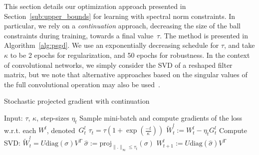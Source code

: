This section details our optimization approach presented in Section~\ref{sub:upper_bounds}
for learning with spectral norm constraints.
In particular, we rely on a \emph{continuation} approach, decreasing the size of the ball constraints
during training, towards a final value~$\tau$. The method is presented in Algorithm~\ref{alg:psgd}.
We use an exponentially decreasing schedule for $\tau$,
and take $\kappa$ to be 2 epochs for regularization, and 50 epochs for robustness.
In the context of convolutional networks, we simply consider the SVD of a reshaped filter matrix,
but we note that alternative approaches based on the singular values of the full convolutional operation
may also be used~\citep{sedghi2018singular}.


\begin{algorithm}[th]
	\caption{Stochastic projected gradient with continuation}
	\label{alg:psgd}
	\begin{algorithmic}
	\STATE Input: $\tau$, $\kappa$, step-sizes $\eta_t$
		\STATE Sample mini-batch and compute gradients of the loss w.r.t. each $W^l$, denoted~$G_t^l$
		\STATE $\tau_{t}=\tau (1 + \exp{\left(\frac{-t}{\kappa}\right)})$
		\STATE 	$\tilde W_t^l := W_t^l - \eta_t G_t^l$
		\STATE Compute SVD: $\tilde W_t^l = U \text{diag}(\sigma) V^T$
		\STATE  $ \widehat{\sigma} := \text{proj}_{\|.\|_{\infty} \leq \tau_t}\left(\sigma\right)$
		\STATE 	$ W_{t+1}^l := U\text{diag}(\widehat{\sigma})V^T$
		\ENDFOR
		\ENDFOR
	\end{algorithmic}
\end{algorithm}

